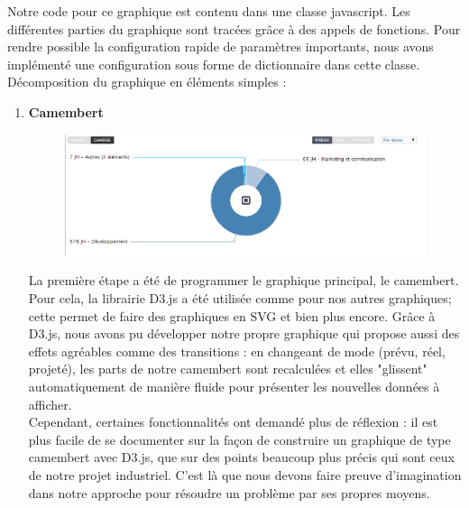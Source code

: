 \documentclass[12pt]{report}
\begin{document}
Notre code pour ce graphique est contenu dans une classe javascript. Les différentes parties du graphique sont tracées grâce à des appels de fonctions. Pour rendre possible la configuration rapide de paramètres importants, nous avons implémenté une configuration sous forme de dictionnaire dans cette classe.\\

Décomposition du graphique en éléments simples :\\

\begin{enumerate}
\item \textbf{Camembert}\\

\begin{figure}[H]
	\centering
	\includegraphics[width=1\textwidth]{pictures/realisations/camembert.jpg}
	\caption{}
	\label{18}
\end{figure}

La première étape a été de programmer le graphique principal, le camembert. Pour cela, la librairie D3.js a été utilisée comme pour nos autres graphiques; cette permet de faire des graphiques en SVG et bien plus encore. Grâce à D3.js, nous avons pu développer notre propre graphique qui propose aussi des effets agréables comme des transitions : en changeant de mode (prévu, réel, projeté), les parts de notre camembert sont recalculées et elles "glissent" automatiquement de manière fluide pour présenter les nouvelles données à afficher.\\

Cependant, certaines fonctionnalités ont demandé plus de réflexion : il est plus facile de se documenter sur la façon de construire un graphique de type camembert avec D3.js, que sur des points beaucoup plus précis qui sont ceux de notre projet industriel. C'est là que nous devons faire preuve d'imagination dans notre approche pour résoudre un problème par ses propres moyens. \\


\end{enumerate}
\end{document}
